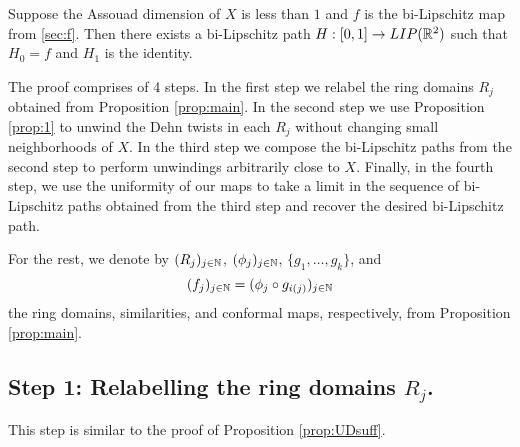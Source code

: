 \documentclass{amsart}
\DeclareMathOperator{\dist}{dist}
\begin{document}
\begin{theorem}\label{thm:main}
Suppose the Assouad dimension of $X$ is less than $1$ and $f$ is the bi-Lipschitz map from \textsection\ref{sec:f}. Then there exists a bi-Lipschitz path $H: [0,1] \to LIP(\mathbb{R}^2)$ such that $H_0 = f$ and $H_1$ is the identity.
\end{theorem}

The proof comprises of 4 steps. In the first step we relabel the ring domains $R_j$ obtained from Proposition \ref{prop:main}. In the second step we use Proposition \ref{prop:1} to unwind the Dehn twists in each $R_j$ without changing small neighborhoods of $X$. In the third step we compose the bi-Lipschitz paths from the second step to perform unwindings arbitrarily close to $X$. Finally, in the fourth step, we use the uniformity of our maps to take a limit in the sequence of bi-Lipschitz paths obtained from the third step and recover the desired bi-Lipschitz path.

For the rest, we denote by $(R_j)_{j\in\mathbb{N}}$, $(\phi_j)_{j\in\mathbb{N}}$, $\{g_1,\dots,g_k\}$, and 
\[ (f_j)_{j\in\mathbb{N}} = (\phi_j\circ g_{i(j)})_{j\in\mathbb{N}}\] 
the ring domains, similarities, and conformal maps, respectively, from Proposition \ref{prop:main}.









\subsection{Step 1: Relabelling the ring domains $R_j$.} This step is similar to the proof of Proposition \ref{prop:UDsuff}.
\end{document}
